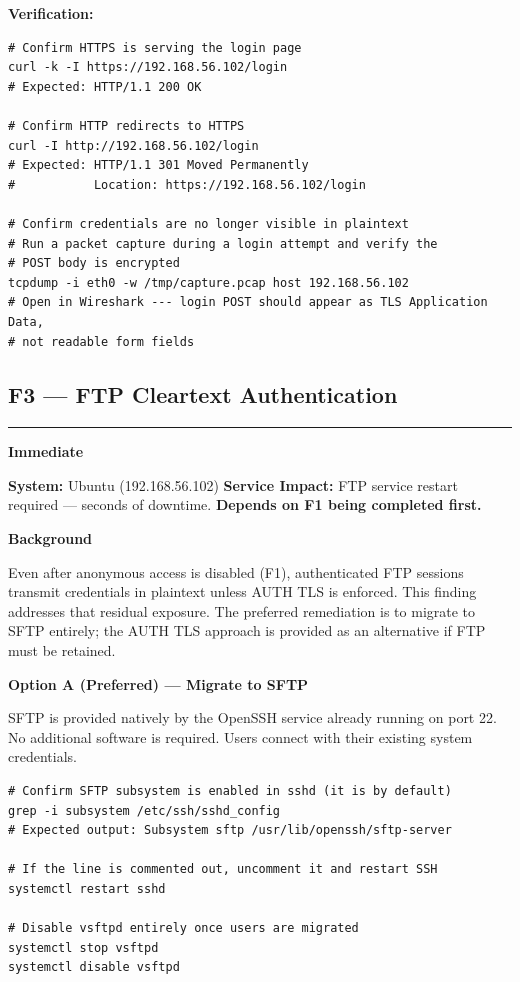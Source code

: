 \documentclass[12pt]{article}
\newcommand{\tfbadge}[2]{%
  \colorbox{#1}{\color{white}\textbf{\small #2}}%
}
\newcommand{\sectionrule}{%
  \vspace{4pt}\noindent\textcolor{headercol}{\rule{\linewidth}{0.8pt}}\vspace{4pt}%
}
\begin{document}
\bigskip
 
\begin{verifybox}
\textbf{Verification:}
\begin{lstlisting}[style=terminal]
# Confirm HTTPS is serving the login page
curl -k -I https://192.168.56.102/login
# Expected: HTTP/1.1 200 OK
 
# Confirm HTTP redirects to HTTPS
curl -I http://192.168.56.102/login
# Expected: HTTP/1.1 301 Moved Permanently
#           Location: https://192.168.56.102/login
 
# Confirm credentials are no longer visible in plaintext
# Run a packet capture during a login attempt and verify the
# POST body is encrypted
tcpdump -i eth0 -w /tmp/capture.pcap host 192.168.56.102
# Open in Wireshark --- login POST should appear as TLS Application Data,
# not readable form fields
\end{lstlisting}
\end{verifybox}
 
\subsection{F3 --- FTP Cleartext Authentication}
\sectionrule
 
\noindent\tfbadge{immediatecol}{Immediate}
\quad\textbf{System:} Ubuntu (192.168.56.102)
\quad\textbf{Service Impact:} FTP service restart required --- seconds of
downtime. \textbf{Depends on F1 being completed first.}
 
\bigskip
\noindent\textbf{Background}
 
Even after anonymous access is disabled (F1), authenticated FTP sessions
transmit credentials in plaintext unless AUTH TLS is enforced. This finding
addresses that residual exposure. The preferred remediation is to migrate to
SFTP entirely; the AUTH TLS approach is provided as an alternative if FTP
must be retained.
 
\bigskip
\noindent\textbf{Option A (Preferred) --- Migrate to SFTP}
 
SFTP is provided natively by the OpenSSH service already running on port 22.
No additional software is required. Users connect with their existing system
credentials.
 
\begin{lstlisting}[style=terminal]
# Confirm SFTP subsystem is enabled in sshd (it is by default)
grep -i subsystem /etc/ssh/sshd_config
# Expected output: Subsystem sftp /usr/lib/openssh/sftp-server
 
# If the line is commented out, uncomment it and restart SSH
systemctl restart sshd
 
# Disable vsftpd entirely once users are migrated
systemctl stop vsftpd
systemctl disable vsftpd
\end{lstlisting}
 
\end{document}
